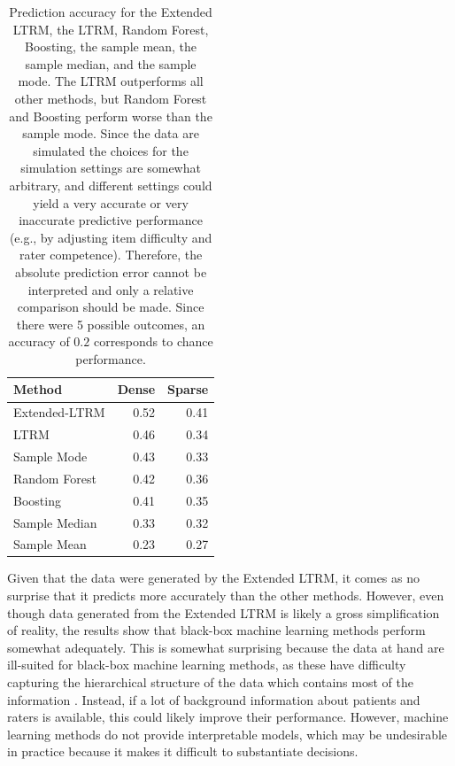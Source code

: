 \documentclass[a4paper,usenames,dvipsnames]{article}
\newenvironment{revision}{\color{black}}{\color{black}}
\begin{document}
\begin{table}[ht]
	\centering
	\caption{Prediction accuracy for the \protect\begin{revision}Extended LTRM, the\protect\end{revision} LTRM, Random Forest, Boosting, \protect\begin{revision}the sample mean, the sample median, \protect\end{revision}and the sample mode. The LTRM outperforms all other methods, but Random Forest and Boosting perform worse than the sample mode. Since the data are simulated the choices for the simulation settings are somewhat arbitrary, and different settings could yield a very accurate or very inaccurate predictive performance (e.g., by adjusting item difficulty and rater competence). Therefore, the absolute prediction error cannot be interpreted and only a relative comparison should be made. Since there were 5 possible outcomes, an accuracy of $0.2$ corresponds to chance performance.}
	\begin{tabular}{lrr}
		\toprule
		Method & Dense & Sparse \\ 
		\midrule
		Extended-LTRM & 0.52 & 0.41 \\ 
		LTRM & 0.46 & 0.34 \\ 
		Sample Mode & 0.43 & 0.33 \\ 
		Random Forest & 0.42 & 0.36 \\ 
		Boosting & 0.41 & 0.35 \\ 
		Sample Median & 0.33 & 0.32 \\ 
		Sample Mean & 0.23 & 0.27 \\ 
		\bottomrule
	\end{tabular}
\end{table}
Given that the data were generated by the \protect\begin{revision}Extended \protect\end{revision}LTRM, it comes as no surprise that it predicts more accurately than the other methods. However, even though data generated from the \protect\begin{revision}Extended \protect\end{revision}LTRM is likely a gross simplification of reality, the results show that black-box machine learning methods perform somewhat adequately. This is somewhat surprising because the data at hand are ill-suited for black-box machine learning methods, as these have difficulty capturing the hierarchical structure of the data which contains most of the information \cite<but see>{hajjem2014mixed}. Instead, if a lot of background information about patients and raters is available, this could likely improve their performance. However, machine learning methods do not provide interpretable models, which may be undesirable in practice because it makes it difficult to substantiate decisions.
\end{document}
